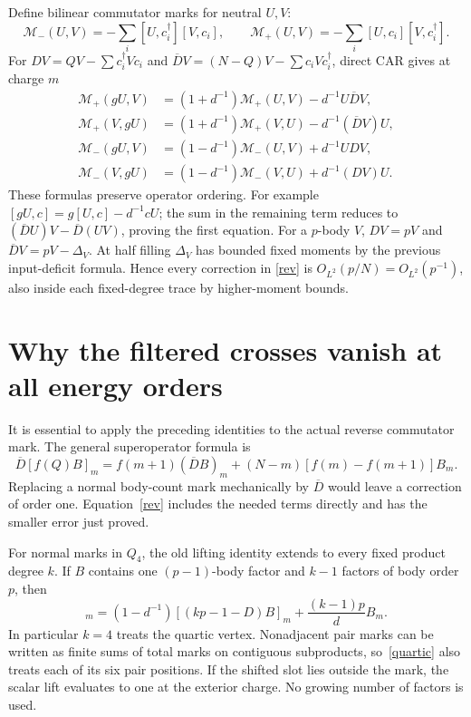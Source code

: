 \documentclass[11pt,a4paper]{article}
\newcommand{\Db}{\overline D}
\begin{document}
Define bilinear commutator marks for neutral $U,V$:
\begin{equation}
 \mathcal M_-(U,V)=-\sum_i[U,c_i^\dagger][V,c_i],\qquad
 \mathcal M_+(U,V)=-\sum_i[U,c_i][V,c_i^\dagger].
\end{equation}
For $D V=QV-\sum c_i^\dagger Vc_i$ and
$\Db V=(N-Q)V-\sum c_iVc_i^\dagger$, direct CAR gives at charge $m$
\begin{align}
 \mathcal M_+(gU,V)&=(1+d^{-1})\mathcal M_+(U,V)-d^{-1}U\Db V,\\
 \mathcal M_+(V,gU)&=(1+d^{-1})\mathcal M_+(V,U)-d^{-1}(\Db V)U,\label{rev}\\
 \mathcal M_-(gU,V)&=(1-d^{-1})\mathcal M_-(U,V)+d^{-1}UDV,\\
 \mathcal M_-(V,gU)&=(1-d^{-1})\mathcal M_-(V,U)+d^{-1}(DV)U.
\end{align}
These formulas preserve operator ordering. For example
$[gU,c]=g[U,c]-d^{-1}cU$; the sum in the remaining term reduces
to $(\Db U)V-\Db(UV)$, proving the first equation.
For a $p$-body $V$, $DV=pV$ and $\Db V=pV-\Delta_V$.
At half filling $\Delta_V$ has bounded fixed moments by the
previous input-deficit formula. Hence every correction in
\eqref{rev} is $O_{L^2}(p/N)=O_{L^2}(p^{-1})$, also inside each
fixed-degree trace by higher-moment bounds.

\newpage
\section{Why the filtered crosses vanish at all energy orders}
It is essential to apply the preceding identities to the actual
reverse commutator mark. The general superoperator formula is
\begin{equation}
 \Db[f(Q)B]_m=f(m+1)(\Db B)_m
              +(N-m)[f(m)-f(m+1)]B_m.
\end{equation}
Replacing a normal body-count mark mechanically by $\Db$ would
leave a correction of order one. Equation~\eqref{rev} includes
the needed terms directly and has the smaller error just proved.

For normal marks in $Q_4$, the old lifting identity extends to
every fixed product degree $k$. If $B$ contains one $(p-1)$-body
factor and $k-1$ factors of body order $p$, then
\begin{equation}
 [(kp-D)(gB)]_m
 =(1-d^{-1})[(kp-1-D)B]_m+\frac{(k-1)p}{d}B_m. \label{quartic}
\end{equation}
In particular $k=4$ treats the quartic vertex. Nonadjacent pair
marks can be written as finite sums of total marks on contiguous
subproducts, so~\eqref{quartic} also treats each of its six pair
positions. If the shifted slot lies outside the mark, the scalar
lift evaluates to one at the exterior charge. No growing number
of factors is used.
\end{document}
